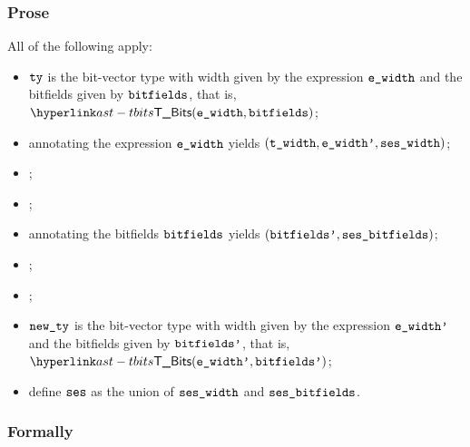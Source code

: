 \subsubsection{Prose}
All of the following apply:
\begin{itemize}
  \item $\tty$ is the bit-vector type with width given by the expression
    $\ewidth$ and the bitfields given by $\bitfields$, that is, $\TBits(\ewidth, \bitfields)$;
  \item annotating the expression $\ewidth$ yields $(\twidth, \ewidthp, \seswidth)$\ProseOrTypeError;
  \item \Prosecheckstaticallyevaluable{\seswidth};
  \item \Prosecheckconstrainedinteger{$\tenv$}{$\twidth$};
  \item annotating the bitfields $\bitfields$ yields $(\bitfieldsp, \vsesbitfields)$\ProseOrTypeError;
  \item \Prosestaticeval{$\tenv$}{$\ewidthp$}{$\lint(\vwidth)$};
  \item \Prosecheckcommonbitfieldsalign{$\tenv$}{$\bitfieldsp$}{$\vwidth$}\ProseOrTypeError;
  \item $\newty$ is the bit-vector type with width given by the expression
    $\ewidthp$ and the bitfields given by $\bitfieldsp$, that is, $\TBits(\ewidthp, \bitfieldsp)$;
  \item define $\vses$ as the union of $\seswidth$ and $\vsesbitfields$.
\end{itemize}

\subsubsection{Formally}
\begin{mathpar}
\end{mathpar}

